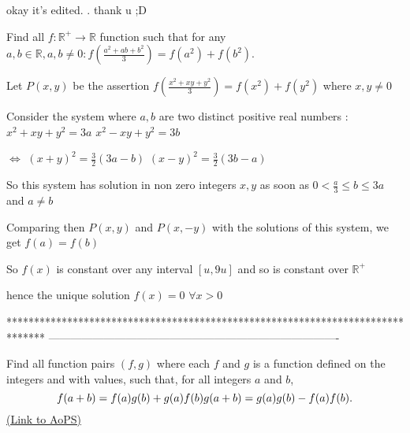 \begin{solution}
	okay it's edited. . thank u ;D
\end{solution}



\begin{solution}
	\begin{tcolorbox}Find all $f:\mathbb{R}^+ \rightarrow \mathbb{R}$ function such that for any $a,b\in \mathbb{R} , a , b \not=0 : f(\frac{a^2+ab+b^2}{3})=f(a^2)+f(b^2)$.\end{tcolorbox}
Let $P(x,y)$ be the assertion $f(\frac{x^2+xy+y^2}3)=f(x^2)+f(y^2)$ where $x,y\ne 0$

Consider the system where $a,b$ are two distinct positive real numbers :
$x^2+xy+y^2=3a$
$x^2-xy+y^2=3b$

$\iff$ 
$(x+y)^2=\frac 32(3a-b)$
$(x-y)^2=\frac 32(3b-a)$

So this system has solution in non zero integers $x,y$ as soon as $0<\frac a3\le b\le 3a$ and $a\ne b$

Comparing then $P(x,y)$ and $P(x,-y)$ with the solutions of this system, we get $f(a)=f(b)$

So $f(x)$ is constant over any interval $[u,9u]$ and so is constant over $\mathbb R^+$

hence the unique solution $\boxed{f(x)=0}$ $\forall x>0$
\end{solution}
*******************************************************************************
-------------------------------------------------------------------------------

\begin{problem}
	Find all function pairs $(f,g)$ where each $f$ and $g$ is a function defined on the integers and with values, such that, for all integers $a$ and $b$, 
\[f(a+b)=f(a)g(b)+g(a)f(b)\\
g(a+b)=g(a)g(b)-f(a)f(b).\]
	\flushright \href{https://artofproblemsolving.com/community/c6h481341}{(Link to AoPS)}
\end{problem}



